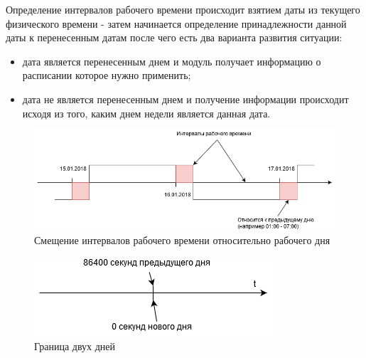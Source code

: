 \indent Определение интервалов рабочего времени происходит взятием даты из текущего физического времени - затем начинается определение принадлежности данной даты к перенесенным датам после чего есть два варианта развития ситуации:

\begin{itemize}
	\item дата является перенесенным днем и модуль получает информацию о расписании которое нужно применить;
	\item дата не является перенесенным днем и получение информации происходит исходя из того, каким днем недели является данная дата.
\end{itemize}

\begin{figure}[h!]
	\centering
	\includegraphics[width=\linewidth]{pics/scheduleIntervals.png}
	\caption{Смещение интервалов рабочего времени относительно рабочего дня}
	\label{fig:intervals}
\end{figure}

\begin{figure}[h!]
	\centering
	\includegraphics[width=0.6\linewidth]{pics/scheduleTime.png}
	\caption{Граница двух дней}
	\label{fig:time}
\end{figure}


